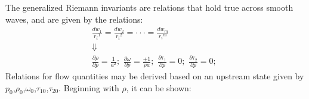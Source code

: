 The generalized Riemann invariants are relations that hold true across smooth waves, and are given by the relations\cite{Toro2009}:
\[\begin{array}{c}
\frac{{d{w_1}}}{{{r_i}^1}} = \frac{{d{w_2}}}{{{r_i}^2}} =  \cdot  \cdot  \cdot  = \frac{{d{w_m}}}{{{r_i}^m}}\\
 \Downarrow \\
\frac{{\partial \rho }}{{\partial p}} = \frac{1}{{{a^2}}};\,\,\frac{{\partial \omega }}{{\partial p}} = \frac{{ \pm 1}}{{\rho a}};\,\,\frac{{\partial {\tau _1}}}{{\partial p}} = 0;\,\,\frac{{\partial {\tau _2}}}{{\partial p}} = 0;\,\,
\end{array}\]
Relations for flow quantities may be derived based on an upstream state given by $p_0$,$\rho_0$,$\omega_0$,$\tau_10$,$\tau_20$.
Beginning with $\rho$, it can be shown:
